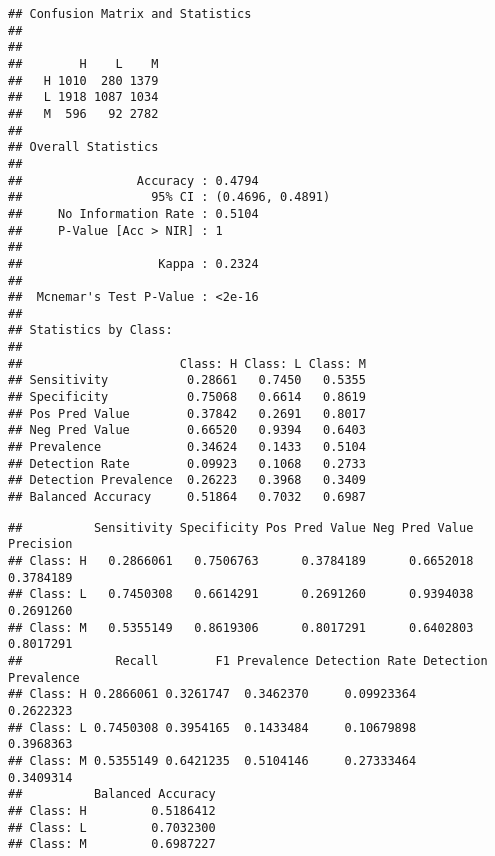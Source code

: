\documentclass[]{article}
\newenvironment{Shaded}{\begin{snugshade}}{\end{snugshade}}
\newcommand{\KeywordTok}[1]{\textcolor[rgb]{0.13,0.29,0.53}{\textbf{#1}}}
\newcommand{\NormalTok}[1]{#1}
\newcommand{\OperatorTok}[1]{\textcolor[rgb]{0.81,0.36,0.00}{\textbf{#1}}}
\begin{document}
\begin{verbatim}
## Confusion Matrix and Statistics
## 
##    
##        H    L    M
##   H 1010  280 1379
##   L 1918 1087 1034
##   M  596   92 2782
## 
## Overall Statistics
##                                           
##                Accuracy : 0.4794          
##                  95% CI : (0.4696, 0.4891)
##     No Information Rate : 0.5104          
##     P-Value [Acc > NIR] : 1               
##                                           
##                   Kappa : 0.2324          
##                                           
##  Mcnemar's Test P-Value : <2e-16          
## 
## Statistics by Class:
## 
##                      Class: H Class: L Class: M
## Sensitivity           0.28661   0.7450   0.5355
## Specificity           0.75068   0.6614   0.8619
## Pos Pred Value        0.37842   0.2691   0.8017
## Neg Pred Value        0.66520   0.9394   0.6403
## Prevalence            0.34624   0.1433   0.5104
## Detection Rate        0.09923   0.1068   0.2733
## Detection Prevalence  0.26223   0.3968   0.3409
## Balanced Accuracy     0.51864   0.7032   0.6987
\end{verbatim}

\begin{Shaded}
\end{Shaded}

\begin{verbatim}
##          Sensitivity Specificity Pos Pred Value Neg Pred Value Precision
## Class: H   0.2866061   0.7506763      0.3784189      0.6652018 0.3784189
## Class: L   0.7450308   0.6614291      0.2691260      0.9394038 0.2691260
## Class: M   0.5355149   0.8619306      0.8017291      0.6402803 0.8017291
##             Recall        F1 Prevalence Detection Rate Detection Prevalence
## Class: H 0.2866061 0.3261747  0.3462370     0.09923364            0.2622323
## Class: L 0.7450308 0.3954165  0.1433484     0.10679898            0.3968363
## Class: M 0.5355149 0.6421235  0.5104146     0.27333464            0.3409314
##          Balanced Accuracy
## Class: H         0.5186412
## Class: L         0.7032300
## Class: M         0.6987227
\end{verbatim}
\end{document}
